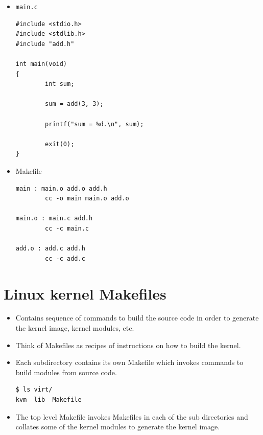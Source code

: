 \documentclass{beamer}
\begin{document}
\begin{frame}[fragile]
  \begin{itemize}
  \item \texttt{main.c}
\begin{lstlisting}
#include <stdio.h>
#include <stdlib.h>
#include "add.h"

int main(void)
{
        int sum;

        sum = add(3, 3);

        printf("sum = %d.\n", sum);

        exit(0);
}
\end{lstlisting}
  \end{itemize}
\end{frame}

\begin{frame}[fragile]
  \begin{itemize}
  \item Makefile
\begin{lstlisting}
main : main.o add.o add.h
        cc -o main main.o add.o

main.o : main.c add.h
        cc -c main.c

add.o : add.c add.h
        cc -c add.c
\end{lstlisting}
  \end{itemize}
\end{frame}

\section{Linux kernel Makefiles}

\begin{frame}[fragile]
  \begin{itemize}
  \item Contains sequence of commands to build the source code in
    order to generate the kernel image, kernel modules, etc.
  \item Think of Makefiles as recipes of instructions on how to build the
    kernel.
  \item Each subdirectory contains its own Makefile which invokes commands to
    build modules from source code.
\begin{lstlisting}
$ ls virt/
kvm  lib  Makefile
\end{lstlisting}
  \item The top level Makefile invokes Makefiles in each of the sub directories
    and collates some of the kernel modules to generate the kernel image.
  \end{itemize}
\end{frame}
\end{document}
